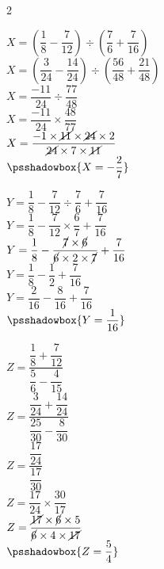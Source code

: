 \begin{corrige}
    \phantom{rrr}    
    \begin{multicols}2
        \begin{list}{}{}
            \begin{spacing}{2}
                \item 
                $X = \left(\dfrac18 - \dfrac{7}{12}\right)  \div  \left(\dfrac{7}{6}+\dfrac{7}{16}\right)$ \\
                $X = \left(\dfrac{3}{24} - \dfrac{14}{24}\right)  \div  \left(\dfrac{56}{48}+\dfrac{21}{48}\right)$ \\
                $X = \dfrac{-11}{24}  \div  \dfrac{77}{48}$ \\
                $X = \dfrac{-11}{24}  \times  \dfrac{48}{77}$ \\
                $X = \dfrac{-1\times \cancel{11}\times \cancel{24} \times 2}{\cancel{24}\times 7\times \cancel{11}}$ \\
                $\psshadowbox{X = -\dfrac{2}{7}}$
                \item 
                $Y = \dfrac18 - \dfrac{7}{12}  \div  \dfrac{7}{6}+\dfrac{7}{16}$ \\
                $Y = \dfrac18 - \dfrac{7}{12}  \times  \dfrac{6}{7}+\dfrac{7}{16}$ \\
                $Y = \dfrac18 - \dfrac{\cancel{7}\times \cancel{6}}{\cancel{6}\times 2\times \cancel{7}}+\dfrac{7}{16}$ \\
                $Y = \dfrac18 - \dfrac{1}{2}+\dfrac{7}{16}$ \\
                $Y = \dfrac{2}{16} - \dfrac{8}{16}+\dfrac{7}{16}$ \\
                $\psshadowbox{Y = \dfrac{1}{16}}$
                \columnbreak
                \item 
                $Z = \dfrac{\dfrac18 + \dfrac{7}{12}}{\dfrac{5}{6}-\dfrac{4}{15}}$ \\
                \medskip
                $Z = \dfrac{\dfrac{3}{24} + \dfrac{14}{24}}{\dfrac{25}{30}-\dfrac{8}{30}}$ \\
                \medskip
                $Z = \dfrac{\dfrac{17}{24}}{\dfrac{17}{30}}$ \\
                \medskip
                $Z = \dfrac{17}{24}\times\dfrac{30}{17}$ \\
                $Z = \dfrac{\cancel{17}\times\cancel{6}\times 5}{\cancel{6}\times 4\times\cancel{17}}$ \\
                $\psshadowbox{Z = \dfrac{5}{4}}$
            \end{spacing}
        \end{list}
    \end{multicols}
\end{corrige}

